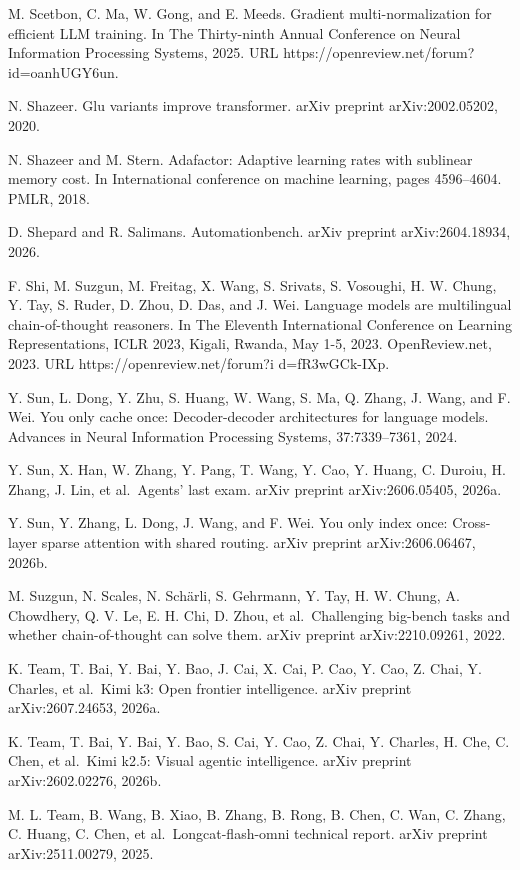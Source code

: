\documentclass[
  10
]{article}
\begin{document}
M. Scetbon, C. Ma, W. Gong, and E. Meeds. Gradient multi-normalization
for efficient LLM training. In The Thirty-ninth Annual Conference on
Neural Information Processing Systems, 2025. URL
https://openreview.net/forum?id=oanhUGY6un.

N. Shazeer. Glu variants improve transformer. arXiv preprint
arXiv:2002.05202, 2020.

N. Shazeer and M. Stern. Adafactor: Adaptive learning rates with
sublinear memory cost. In International conference on machine learning,
pages 4596--4604. PMLR, 2018.

D. Shepard and R. Salimans. Automationbench. arXiv preprint
arXiv:2604.18934, 2026.

F. Shi, M. Suzgun, M. Freitag, X. Wang, S. Srivats, S. Vosoughi, H. W.
Chung, Y. Tay, S. Ruder, D. Zhou, D. Das, and J. Wei. Language models
are multilingual chain-of-thought reasoners. In The Eleventh
International Conference on Learning Representations, ICLR 2023, Kigali,
Rwanda, May 1-5, 2023. OpenReview.net, 2023. URL
https://openreview.net/forum?i d=fR3wGCk-IXp.

Y. Sun, L. Dong, Y. Zhu, S. Huang, W. Wang, S. Ma, Q. Zhang, J. Wang,
and F. Wei. You only cache once: Decoder-decoder architectures for
language models. Advances in Neural Information Processing Systems,
37:7339--7361, 2024.



Y. Sun, X. Han, W. Zhang, Y. Pang, T. Wang, Y. Cao, Y. Huang, C. Duroiu,
H. Zhang, J. Lin, et al.~Agents' last exam. arXiv preprint
arXiv:2606.05405, 2026a.

Y. Sun, Y. Zhang, L. Dong, J. Wang, and F. Wei. You only index once:
Cross-layer sparse attention with shared routing. arXiv preprint
arXiv:2606.06467, 2026b.

M. Suzgun, N. Scales, N. Schärli, S. Gehrmann, Y. Tay, H. W. Chung, A.
Chowdhery, Q. V. Le, E. H. Chi, D. Zhou, et al.~Challenging big-bench
tasks and whether chain-of-thought can solve them. arXiv preprint
arXiv:2210.09261, 2022.

K. Team, T. Bai, Y. Bai, Y. Bao, J. Cai, X. Cai, P. Cao, Y. Cao, Z.
Chai, Y. Charles, et al.~Kimi k3: Open frontier intelligence. arXiv
preprint arXiv:2607.24653, 2026a.

K. Team, T. Bai, Y. Bai, Y. Bao, S. Cai, Y. Cao, Z. Chai, Y. Charles, H.
Che, C. Chen, et al.~Kimi k2.5: Visual agentic intelligence. arXiv
preprint arXiv:2602.02276, 2026b.

M. L. Team, B. Wang, B. Xiao, B. Zhang, B. Rong, B. Chen, C. Wan, C.
Zhang, C. Huang, C. Chen, et al.~Longcat-flash-omni technical report.
arXiv preprint arXiv:2511.00279, 2025.
\end{document}
